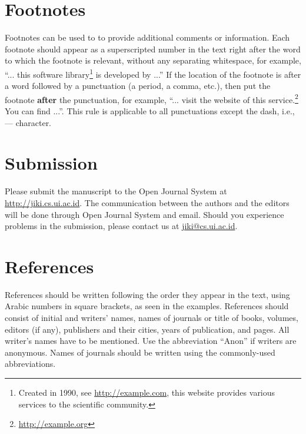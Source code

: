 \documentclass[conference, compsoc, twoside]{IEEEtran}
\begin{document}
\section{Footnotes}
Footnotes can be used to to provide additional comments or information. Each footnote should appear as a superscripted number in the text right after the word to which the footnote is relevant, without any separating whitespace, for example, ``... this software library\footnote{Created in 1990, see \url{http://example.com}, this website provides various services to the scientific community.} is developed by ...'' If the location of the footnote is after a word followed by a punctuation (a period, a comma, etc.), then put the footnote \textbf{after} the punctuation, for example, ``... visit the website of this service.\footnote{\url{http://example.org}} You can find ...''. This rule is applicable to all punctuations except the dash, i.e., --- character. 

\section{Submission}
Please submit the manuscript to the Open Journal System at \url{http://jiki.cs.ui.ac.id}. The communication between the authors and the editors will be done through Open Journal System and email. Should you experience problems in the submission, please contact us at \url{jiki@cs.ui.ac.id}.

\section{References}
References should be written following the order they appear in the text, using Arabic numbers in square brackets, as seen in the examples. References should consist of initial and writers’ names, names of journals or title of books, volumes, editors (if any), publishers and their cities, years of publication, and pages. All writer’s names have to be mentioned. Use the abbreviation “Anon” if writers are anonymous. Names of journals should be written using the commonly-used abbreviations.
\end{document}
